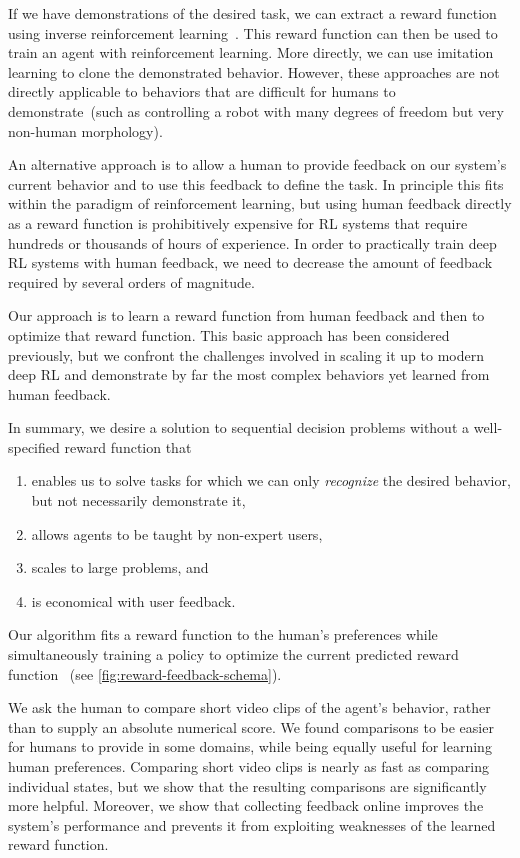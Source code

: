 If we have demonstrations of the desired task, we can extract a reward function using inverse reinforcement learning~\citep{Ng00}. This reward function can then be used to train an agent with reinforcement learning. More directly, we can use imitation learning to clone the demonstrated behavior. However, these approaches are not directly applicable to behaviors that are difficult for humans to demonstrate~(such as controlling a robot with many degrees of freedom but very non-human morphology).

An alternative approach is to allow a human to provide feedback on our system's current behavior and to use this feedback to define the task. In principle this fits within the paradigm of reinforcement learning, but using human feedback directly as a reward function is prohibitively expensive for RL systems that require hundreds or thousands of hours of experience. In order to practically train deep RL systems with human feedback, we need to decrease the amount of feedback required by several orders of magnitude.

Our approach is to learn a reward function from human feedback and then to optimize that reward function. This basic approach has been considered previously, but we confront the challenges involved in scaling it up to modern deep RL and demonstrate by far the most complex behaviors yet learned from human feedback.

In summary, we desire a solution to sequential decision problems without a well-specified reward function that

\begin{enumerate}
\item enables us to solve tasks for which we can only \emph{recognize} the desired behavior, but not necessarily demonstrate it, \item allows agents to be taught by non-expert users, \item scales to large problems, and \item is economical with user feedback.
\end{enumerate}

Our algorithm fits a reward function to the human's preferences while simultaneously training a policy to optimize the current predicted reward function ~(see \autoref{fig:reward-feedback-schema}).

We ask the human to compare short video clips of the agent's behavior, rather than to supply an absolute numerical score. We found comparisons to be easier for humans to provide in some domains, while being equally useful for learning human preferences. Comparing short video clips is nearly as fast as comparing individual states, but we show that the resulting comparisons are significantly more helpful. Moreover, we show that collecting feedback online improves the system's performance and prevents it from exploiting weaknesses of the learned reward function.

